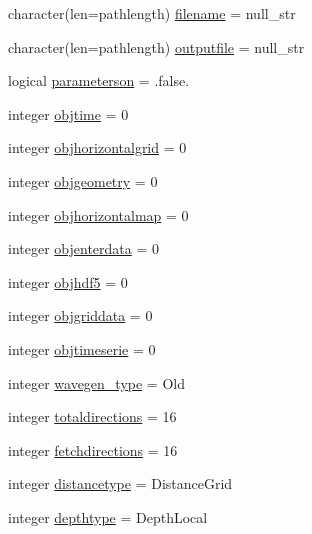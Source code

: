 \begin{DoxyCompactItemize}
\item 
character(len=pathlength) \mbox{\hyperlink{structmodulewaves_1_1t__waves_a41515160f20c13a42a11b40b74631e42}{filename}} = null\+\_\+str
\item 
character(len=pathlength) \mbox{\hyperlink{structmodulewaves_1_1t__waves_a2887b8450f46a6a27ab1f0a0436948bc}{outputfile}} = null\+\_\+str
\item 
logical \mbox{\hyperlink{structmodulewaves_1_1t__waves_adf6aad544763d5137e3cc91b43381882}{parameterson}} = .false.
\item 
integer \mbox{\hyperlink{structmodulewaves_1_1t__waves_a4b6639da741e73e6284d1182851b9705}{objtime}} = 0
\item 
integer \mbox{\hyperlink{structmodulewaves_1_1t__waves_a31a632455fe76331123fac96c9467210}{objhorizontalgrid}} = 0
\item 
integer \mbox{\hyperlink{structmodulewaves_1_1t__waves_af3e2a582d5e8a343c44a33e26bff7c52}{objgeometry}} = 0
\item 
integer \mbox{\hyperlink{structmodulewaves_1_1t__waves_a3e6320c4fd2540088c0ec70bf335951c}{objhorizontalmap}} = 0
\item 
integer \mbox{\hyperlink{structmodulewaves_1_1t__waves_a130d670a3b4e280db3161697f6f0b71c}{objenterdata}} = 0
\item 
integer \mbox{\hyperlink{structmodulewaves_1_1t__waves_a128e8c6a3a8d34ed7b4f7ef506fee85a}{objhdf5}} = 0
\item 
integer \mbox{\hyperlink{structmodulewaves_1_1t__waves_ac6e97643bf01eef9fbf23d644ede4d65}{objgriddata}} = 0
\item 
integer \mbox{\hyperlink{structmodulewaves_1_1t__waves_a010ee707430494fbdf806741017fcf7c}{objtimeserie}} = 0
\item 
integer \mbox{\hyperlink{structmodulewaves_1_1t__waves_a21a26f0dbcc427b9feb15f8499fedf1c}{wavegen\+\_\+type}} = Old
\item 
integer \mbox{\hyperlink{structmodulewaves_1_1t__waves_ac9315fab3724fd2f321db966286196fd}{totaldirections}} = 16
\item 
integer \mbox{\hyperlink{structmodulewaves_1_1t__waves_ae8a7a56ba14ed3770cc8dd542f305181}{fetchdirections}} = 16
\item 
integer \mbox{\hyperlink{structmodulewaves_1_1t__waves_a726a7155325136c59797a3ae393fc862}{distancetype}} = Distance\+Grid
\item 
integer \mbox{\hyperlink{structmodulewaves_1_1t__waves_a631e9d4385fd6e7b6573962004b84ca4}{depthtype}} = Depth\+Local
\item 

\end{DoxyCompactItemize}
